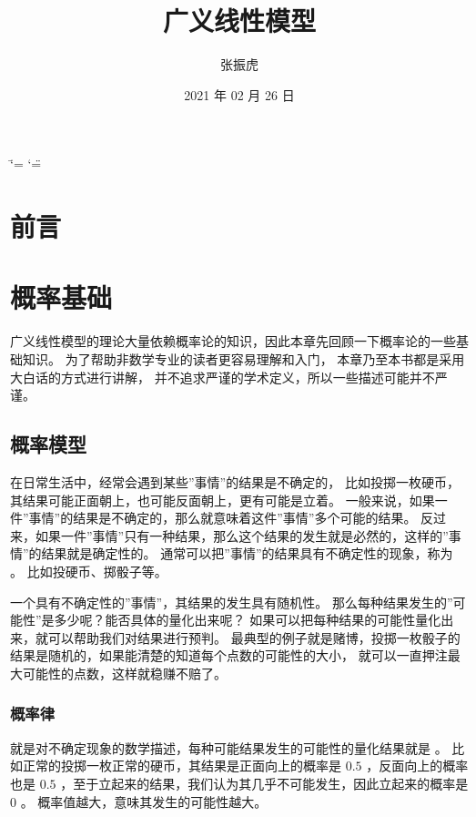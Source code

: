 \documentclass[letterpaper,10pt,english]{sphinxmanual}
\title{广义线性模型}
\date{2021 年 02 月 26 日}
\author{张振虎}
\begin{document}
\ifdefined\shorthandoff
  \ifnum\catcode`\=\string=\active\shorthandoff{=}\fi
  \ifnum\catcode`\"=\active{}\fi
\fi

\pagestyle{empty}
\sphinxmaketitle
\pagestyle{plain}
\sphinxtableofcontents
\pagestyle{normal}
\label{\detokenize{index::doc}}



\chapter{前言}
\label{\detokenize{_u524d_u8a00/content:id1}}\label{\detokenize{_u524d_u8a00/content::doc}}

\chapter{概率基础}
\label{\detokenize{_u6982_u7387_u57fa_u7840/content:id1}}\label{\detokenize{_u6982_u7387_u57fa_u7840/content::doc}}
广义线性模型的理论大量依赖概率论的知识，因此本章先回顾一下概率论的一些基础知识。
为了帮助非数学专业的读者更容易理解和入门，
本章乃至本书都是采用大白话的方式进行讲解，
并不追求严谨的学术定义，所以一些描述可能并不严谨。


\section{概率模型}
\label{\detokenize{_u6982_u7387_u57fa_u7840/content:id2}}
在日常生活中，经常会遇到某些”事情”的结果是不确定的，
比如投掷一枚硬币，其结果可能正面朝上，也可能反面朝上，更有可能是立着。
一般来说，如果一件”事情”的结果是不确定的，那么就意味着这件”事情”多个可能的结果。
反过来，如果一件”事情”只有一种结果，那么这个结果的发生就是必然的，这样的”事情”的结果就是确定性的。
通常可以把”事情”的结果具有不确定性的现象，称为 。
比如投硬币、掷骰子等。

一个具有不确定性的”事情”，其结果的发生具有随机性。
那么每种结果发生的”可能性”是多少呢？能否具体的量化出来呢？
如果可以把每种结果的可能性量化出来，就可以帮助我们对结果进行预判。
最典型的例子就是赌博，投掷一枚骰子的结果是随机的，如果能清楚的知道每个点数的可能性的大小，
就可以一直押注最大可能性的点数，这样就稳赚不赔了。


\subsection{概率律}
\label{\detokenize{_u6982_u7387_u57fa_u7840/content:id3}}
 就是对不确定现象的数学描述，每种可能结果发生的可能性的量化结果就是 。
比如正常的投掷一枚正常的硬币，其结果是正面向上的概率是 \(0.5\) ，反面向上的概率也是 \(0.5\)
，至于立起来的结果，我们认为其几乎不可能发生，因此立起来的概率是 \(0\) 。
概率值越大，意味其发生的可能性越大。
\end{document}
